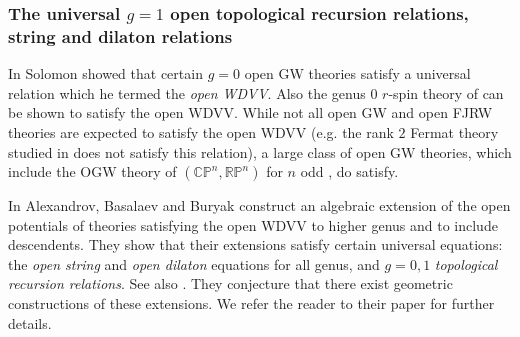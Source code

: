 \documentclass[11pt]{amsart}
\theoremstyle{definition}
\theoremstyle{remark}
\newcommand{\<}{\left<}
\renewcommand{\>}{\right>}
\numberwithin{equation}{section}
\begin{document}
\subsubsection{The universal $g=1$ open topological recursion relations, string and dilaton relations}
In \cite{sol_owdvv} Solomon showed that certain $g=0$ open GW theories satisfy a universal relation which he termed the %
\emph{open WDVV}. Also the %
genus $0$ $r$-spin theory of \cite{BCT1,BCT2,BCT3} can be shown to satisfy the open WDVV. While not all open GW and open FJRW theories are expected to satisfy the open %
WDVV (e.g. the rank $2$ Fermat %
theory studied in \cite{GKT2} does not satisfy this relation), a large class of open GW theories, which include  the OGW theory of $(\mathbb{CP}^n,\mathbb{RP}^n)$ for $n$ odd \cite{solomon2023relative},  %
do satisfy.

In \cite{alexandrov2023construction} Alexandrov, Basalaev and %
Buryak construct an algebraic extension of the open potentials of theories satisfying the open WDVV to higher genus and to include descendents. They show that their extensions satisfy certain universal %
equations: the \emph{open string} %
and \emph{open dilaton} equations for %
all genus, and %
$g=0,1$ \emph{topological recursion relations}. See also \cite{gomez2021open}.
They conjecture that there exist geometric constructions of these extensions. We refer the reader to their paper for further details.
\end{document}

